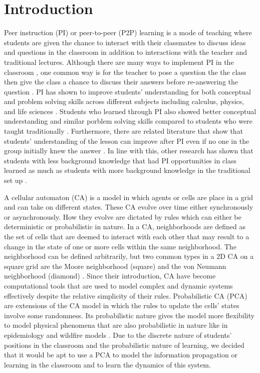 \documentclass[10pt,a4paper,twoside]{article}
\begin{document}
\section{Introduction}\label{sec:intro}
Peer instruction (PI) or peer-to-peer (P2P) learning is a mode of teaching where students are given the chance to interact with their classmates to discuss ideas and questions in the classroom in addition to interactions with the teacher and traditional lectures. Although there are many ways to implement PI in the classroom \cite{knight2018peer}, one common way is for the teacher to pose a question the the class then give the class a chance to discuss their answers before re-answering the question \cite{crouch2001peer}. PI has shown to improve students' understanding for both conceptual and problem solving skills across different subjects including calculus, physics, and life sciences \cite{crouch2001peer,smith2009peer}. Students who learned through PI also showed better conceptual understanding and similar porblem solving skills compared to students who were taught traditionally \cite{lasry2008peer}. Furthermore, there are related literature that show that students' understanding of the lesson can improve after PI even if no one in the group initially knew the answer \cite{smith2009peer}. In line with this, other research has shown that students with less background knowledge that had PI opportunities in class learned as much as students with more background knowledge in the traditional set up \cite{lasry2008peer}.

\noindent A cellular automaton (CA) is a model in which agents or cells are place in a grid and can take on different states. These CA evolve over time either synchronously or asynchronously. How they evolve are dictated by rules which can either be deterministic or probabilistic in nature. In a CA, neighborhoods are defined as the set of cells that are deemed to interact with each other that may result to a change in the state of one or more cells within the same neighborhood. The neighborhood can be defined arbitrarily, but two common types in a 2D CA on a square grid are the Moore neighborhood (square) and the von Neumann neighborhood (diamond) \cite{weisstein2002cellular}. Since their introduction, CA have become computational tools that are used to model complex and dynamic systems effectively despite the relative simplicity of their rules. Probabilistic CA (PCA) are extensions of the CA model in which the rules to update the cells' states involve some randomness. Its probabilistic nature gives the model more flexibility to model physical phenomena that are also probabilistic in nature like in epidemiology and wildfire models \cite{louis2018probabilistic}. Due to the discrete nature of students' positions in the classroom and the probabilistic nature of learning, we decided that it would be apt to use a PCA to model the information propagation or learning in the classroom and to learn the dynamics of this system.
\end{document}
